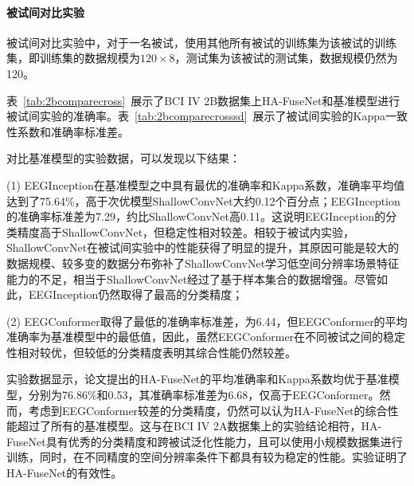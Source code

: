 \paragraph{被试间对比实验}

被试间对比实验中，对于一名被试，使用其他所有被试的训练集为该被试的训练集，即训练集的数据规模为\(120\times8\)，测试集为该被试的测试集，数据规模仍然为120。

表~\ref{tab:2bcomparecross}~展示了BCI IV 2B数据集上HA-FuseNet和基准模型进行被试间实验的准确率。表~\ref{tab:2bcomparecrosssd}~展示了被试间实验的Kappa一致性系数和准确率标准差。

对比基准模型的实验数据，可以发现以下结果：

(1) EEGInception在基准模型之中具有最优的准确率和Kappa系数，准确率平均值达到了75.64\%，高于次优模型ShallowConvNet大约0.12个百分点；EEGInception的准确率标准差为7.29，约比ShallowConvNet高0.11。这说明EEGInception的分类精度高于ShallowConvNet，但稳定性相对较差。相较于被试内实验，ShallowConvNet在被试间实验中的性能获得了明显的提升，其原因可能是较大的数据规模、较多变的数据分布弥补了ShallowConvNet学习低空间分辨率场景特征能力的不足，相当于ShallowConvNet经过了基于样本集合的数据增强。尽管如此，EEGInception仍然取得了最高的分类精度；

(2) EEGConformer取得了最低的准确率标准差，为6.44，但EEGConformer的平均准确率为基准模型中的最低值，因此，虽然EEGConformer在不同被试之间的稳定性相对较优，但较低的分类精度表明其综合性能仍然较差。

实验数据显示，论文提出的HA-FuseNet的平均准确率和Kappa系数均优于基准模型，分别为76.86\%和0.53，其准确率标准差为6.68，仅高于EEGConformer。然而，考虑到EEGConformer较差的分类精度，仍然可以认为HA-FuseNet的综合性能超过了所有的基准模型。这与在BCI IV 2A数据集上的实验结论相符，HA-FuseNet具有优秀的分类精度和跨被试泛化性能力，且可以使用小规模数据集进行训练，同时，在不同精度的空间分辨率条件下都具有较为稳定的性能。实验证明了HA-FuseNet的有效性。

